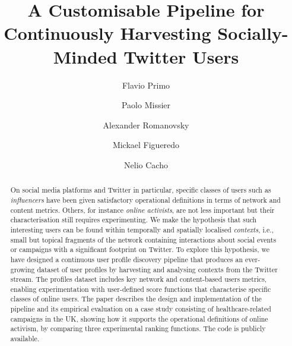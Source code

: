 \documentclass[runningheads]{llncs}
\begin{document}
    \title{A Customisable Pipeline for Continuously Harvesting Socially-Minded Twitter Users}
    \author{Flavio Primo \and
    Paolo Missier \and
    Alexander Romanovsky \and
    Mickael Figueredo \and
    Nelio Cacho}
    
    \maketitle       %
    
    \begin{abstract}
    	On social media platforms and Twitter in particular, specific classes of users such as \textit{influencers}  have been given satisfactory operational definitions in terms of  network and content metrics.
    	Others, for instance \textit{online activists}, are not less important but their characterisation still requires experimenting.
    	We make  the hypothesis that such interesting users can be found within temporally and spatially localised \textit{contexts}, i.e., small but topical fragments of the network containing interactions about social events or campaigns with a significant footprint on Twitter.
    	To explore this hypothesis, we have designed a continuous user profile discovery pipeline that produces an ever-growing dataset of user profiles by harvesting and analysing contexts from the Twitter stream.
    	The profiles dataset includes key network and content-based users metrics, enabling experimentation with user-defined score functions that characterise specific classes of online users.
        The paper describes the design and implementation of  the pipeline and its empirical evaluation on a case study consisting of healthcare-related campaigns in the UK, showing how it supports the operational definitions of online activism, by comparing three experimental ranking functions. The code is publicly available.
    	
    \end{abstract}
\end{document}
